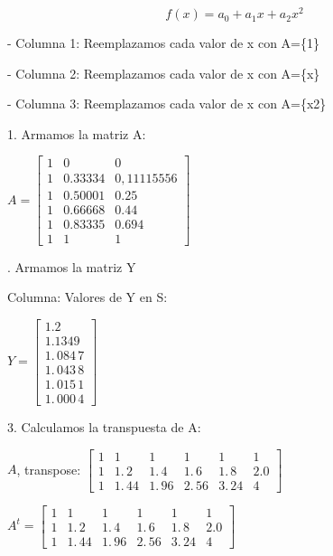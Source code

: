 \documentclass{article}
\begin{document}
\[
f(x)=a_{0}+a_{1}x+a_{2}x^{2} 
\]

- Columna 1: Reemplazamos cada valor de x con A=\{1\}

- Columna 2: Reemplazamos cada valor de x con A=\{x\}

- Columna 3: Reemplazamos cada valor de x con A=\{x2\}

1. Armamos la matriz A:

$A=\left[ 
\begin{array}{ccc}
1 & 0 & 0 \\ 
1 & 0.33334 & 0,11115556 \\ 
1 & 0.50001 & 0.25 \\ 
1 & 0.66668 & 0.44 \\ 
1 & 0.83335 & 0.694 \\ 
1 & 1 & 1%
\end{array}%
\right] $

. Armamos la matriz Y

Columna: Valores de Y en S:

$Y=\left[ 
\begin{array}{c}
1.2 \\ 
1.1349 \\ 
1.\,\allowbreak 084\,7 \\ 
1.\,\allowbreak 043\,8 \\ 
1.\,\allowbreak 015\,1 \\ 
1.\,\allowbreak 000\,4%
\end{array}%
\right] $

3. Calculamos la transpuesta de A:

$A$, transpose: $\left[ 
\begin{array}{cccccc}
1 & 1 & 1 & 1 & 1 & 1 \\ 
1 & 1.\,\allowbreak 2 & 1.\,\allowbreak 4 & 1.\,\allowbreak 6 & 
1.\,\allowbreak 8 & 2.0 \\ 
1 & 1.\,\allowbreak 44 & 1.\,\allowbreak 96 & 2.\,\allowbreak 56 & 
3.\,\allowbreak 24 & 4%
\end{array}%
\right] \allowbreak $

$A^{t}=\left[ 
\begin{array}{cccccc}
1 & 1 & 1 & 1 & 1 & 1 \\ 
1 & 1.\,\allowbreak 2 & 1.\,\allowbreak 4 & 1.\,\allowbreak 6 & 
1.\,\allowbreak 8 & 2.0 \\ 
1 & 1.\,\allowbreak 44 & 1.\,\allowbreak 96 & 2.\,\allowbreak 56 & 
3.\,\allowbreak 24 & 4%
\end{array}%
\right] $
\end{document}
